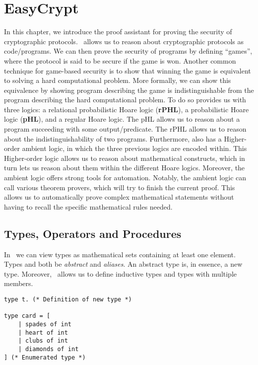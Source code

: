 \chapter{EasyCrypt}
\label{ch:EasyCrypt}
In this chapter, we introduce the \easycrypt proof assistant for proving the security
of cryptographic protocols. \easycrypt\ allows us to reason about cryptographic
protocols as code/programs. We can then prove the security of programs by defining
``games'', where the protocol is said to be secure if the game is won.
Another common technique for game-based security is to show that winning the game is
equivalent to solving a hard computational problem. More formally, we can show
this equivalence by showing program describing the game is indistinguishable
from the program describing the hard computational problem.
To do so \easycrypt provides us with three logics: a relational probabilistic
Hoare logic (\textbf{rPHL}), a probabilistic Hoare logic (\textbf{pHL}), and a
regular Hoare logic. The pHL allows us to reason about a program succeeding with
some output/predicate. The rPHL allows us to reason about the
indistinguishability of two programs.
Furthermore, \easycrypt also has a Higher-order ambient logic, in which the three
previous logics are encoded within. This Higher-order logic allows us to reason
about mathematical constructs, which in turn lets us reason about them within
the different Hoare logics.
Moreover, the ambient logic offers strong tools for automation. Notably, the
ambient logic can call various theorem provers, which will try to finish the
current proof. This allows us to automatically prove complex mathematical
statements without having to recall the specific mathematical rules needed.

\section{Types, Operators and Procedures}
\label{sec:ec_types_and_operators}
In \easycrypt\ we can view types as mathematical sets containing at least one
element. Types and both be \textit{abstract} and \textit{aliases}. An abstract
type is, in essence, a new type. Moreover, \easycrypt\ allows us to define
inductive types and types with multiple members.
\begin{lstlisting}
type t. (* Definition of new type *)

type card = [
    | spades of int
    | heart of int
    | clubs of int
    | diamonds of int
] (* Enumerated type *)
\end{lstlisting}

